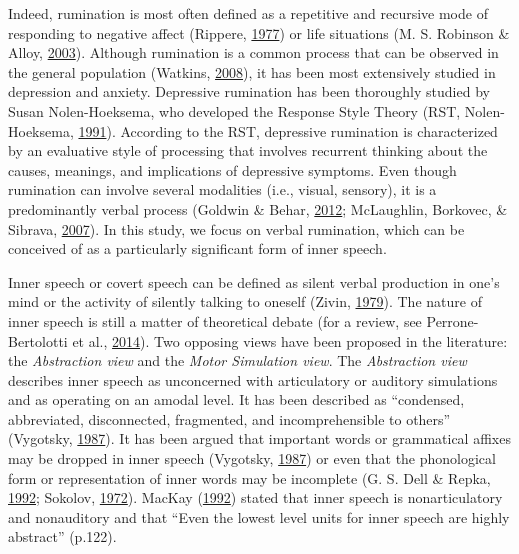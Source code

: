 \documentclass[a4paper,12pt,twoside,openright,oldfontcommands]{memoir}
\begin{document}
Indeed, rumination is most often defined as a repetitive and recursive
mode of responding to negative affect (Rippere,
\protect\hyperlink{ref-Rippere1977}{1977}) or life situations (M. S.
Robinson \& Alloy, \protect\hyperlink{ref-Robinson2003}{2003}). Although
rumination is a common process that can be observed in the general
population (Watkins, \protect\hyperlink{ref-Watkins2008}{2008}), it has
been most extensively studied in depression and anxiety. Depressive
rumination has been thoroughly studied by Susan Nolen-Hoeksema, who
developed the Response Style Theory (RST, Nolen-Hoeksema,
\protect\hyperlink{ref-nolen-hoeksema_responses_1991}{1991}). According
to the RST, depressive rumination is characterized by an evaluative
style of processing that involves recurrent thinking about the causes,
meanings, and implications of depressive symptoms. Even though
rumination can involve several modalities (i.e., visual, sensory), it is
a predominantly verbal process (Goldwin \& Behar,
\protect\hyperlink{ref-goldwin_concreteness_2012}{2012}; McLaughlin,
Borkovec, \& Sibrava,
\protect\hyperlink{ref-mclaughlin_effects_2007}{2007}). In this study,
we focus on verbal rumination, which can be conceived of as a
particularly significant form of inner speech.

Inner speech or covert speech can be defined as silent verbal production
in one's mind or the activity of silently talking to oneself (Zivin,
\protect\hyperlink{ref-zivin_development_1979}{1979}). The nature of
inner speech is still a matter of theoretical debate (for a review, see
Perrone-Bertolotti et al.,
\protect\hyperlink{ref-Perrone-Bertolotti2014}{2014}). Two opposing
views have been proposed in the literature: the \emph{Abstraction view}
and the \emph{Motor Simulation view}. The \emph{Abstraction view}
describes inner speech as unconcerned with articulatory or auditory
simulations and as operating on an amodal level. It has been described
as ``condensed, abbreviated, disconnected, fragmented, and
incomprehensible to others'' (Vygotsky,
\protect\hyperlink{ref-vygotsky_collected_1987}{1987}). It has been
argued that important words or grammatical affixes may be dropped in
inner speech (Vygotsky,
\protect\hyperlink{ref-vygotsky_collected_1987}{1987}) or even that the
phonological form or representation of inner words may be incomplete (G.
S. Dell \& Repka, \protect\hyperlink{ref-dell_errors_1992}{1992};
Sokolov, \protect\hyperlink{ref-sokolov_inner_1972}{1972}). MacKay
(\protect\hyperlink{ref-mackay_constraints_1992}{1992}) stated that
inner speech is nonarticulatory and nonauditory and that ``Even the
lowest level units for inner speech are highly abstract'' (p.122).
\end{document}
